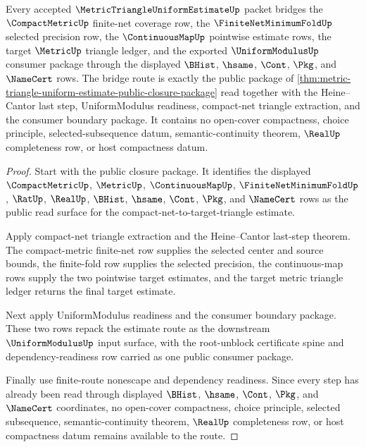 \begin{theorem}
\label{thm:metric-triangle-uniform-estimate-compact-continuous-bridge}
Every accepted $\MetricTriangleUniformEstimateUp$ packet bridges the $\CompactMetricUp$ finite-net coverage row, the $\FiniteNetMinimumFoldUp$ selected precision row, the $\ContinuousMapUp$ pointwise estimate rows, the target $\MetricUp$ triangle ledger, and the exported $\UniformModulusUp$ consumer package through the displayed $\BHist$, $\hsame$, $\Cont$, $\Pkg$, and $\NameCert$ rows. The bridge route is exactly the public package of \autoref{thm:metric-triangle-uniform-estimate-public-closure-package} read together with the Heine--Cantor last step, UniformModulus readiness, compact-net triangle extraction, and the consumer boundary package. It contains no open-cover compactness, choice principle, selected-subsequence datum, semantic-continuity theorem, $\RealUp$ completeness row, or host compactness datum.
\end{theorem}
\begin{proof}
Start with the public closure package. It identifies the displayed $\CompactMetricUp$, $\MetricUp$, $\ContinuousMapUp$, $\FiniteNetMinimumFoldUp$, $\RatUp$, $\RealUp$, $\BHist$, $\hsame$, $\Cont$, $\Pkg$, and $\NameCert$ rows as the public read surface for the compact-net-to-target-triangle estimate.

Apply compact-net triangle extraction and the Heine--Cantor last-step theorem. The compact-metric finite-net row supplies the selected center and source bounds, the finite-fold row supplies the selected precision, the continuous-map rows supply the two pointwise target estimates, and the target metric triangle ledger returns the final target estimate.

Next apply UniformModulus readiness and the consumer boundary package. These two rows repack the estimate route as the downstream $\UniformModulusUp$ input surface, with the root-unblock certificate spine and dependency-readiness row carried as one public consumer package.

Finally use finite-route nonescape and dependency readiness. Since every step has already been read through displayed $\BHist$, $\hsame$, $\Cont$, $\Pkg$, and $\NameCert$ coordinates, no open-cover compactness, choice principle, selected subsequence, semantic-continuity theorem, $\RealUp$ completeness row, or host compactness datum remains available to the route.
\end{proof}

